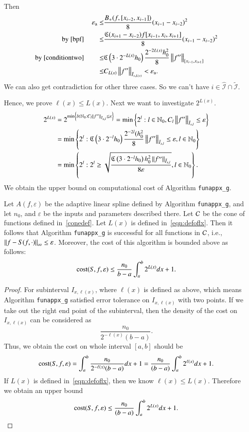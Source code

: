 \begin{enumerate}
  Then
  \begin{align*}
  \abstol \le & \frac{B_+(f,[x_{i-2},x_{i-1}])}{8}(x_{i-1}-x_{i-2})^2 \\ 
  \text{by } \eqref{bpf} \qquad \le  &\frac{\fC(x_{i+1}-x_{i-2})f[x_{i-1},x_{i},x_{i+1}]}{8}(x_{i-1}-x_{i-2})^2\\
  \text{by } \eqref{conditiontwo} \qquad  \le & \fC\left(3\cdot2^{-L(x)}h_0\right) \frac{2^{-2L(x)}h_0^2}{8}\norm[{[x_{i-1},x_{i+1}]}]{f''} \\
     \le & C_{L(x)} \norm[\bar{I}_{x,L(x)}]{f''} < \abstol.
  \end{align*}
  We can also get contradiction for other three cases. So we can't have $i \in \widehat{\mathcal{I}}\cap \widetilde{\mathcal{I}}$.
\end{enumerate}
Hence, we prove $\ell(x) \le L(x)$. Next we want to investigate $2^{L(x)}$.
\begin{align*}
2^{L(x)}&=2^{\min \left\{ l \in \natzero : C_l  \norm[\bar{I}_{x,l}]{f''} \le \varepsilon\right\}} = \min\left\{2^l: l \in  \natzero, C_l \norm[\bar{I}_{x,l}]{f''} \le \varepsilon\right\}\\
 & = \min\left\{2^l:  \fC\left(3\cdot 2^{-l} h_0\right) \frac{2^{-2l}(h_0^2}{8} \norm[\bar{I}_{x,l}]{f''}  \le \varepsilon,  l \in  \natzero\right\}\nonumber \\
 & = \min\left\{2^l:  2^l \ge \sqrt{\frac{\fC\left(3\cdot 2^{-l} h_0\right) h_0^2 \norm[\bar{I}_{x,l}]{f''} }{8\varepsilon}},  l \in  \natzero\right\}.
\end{align*}
We obtain the upper bound on computational cost of Algorithm \texttt{funappx\_g}.

\begin{theorem}\label{thm:cost}
Let $A(f,\varepsilon)$ be the adaptive linear spline defined by Algorithm \textnormal{\texttt{funappx\_g}}, and let $n_0$, and $\varepsilon$ be the inputs and parameters described there. Let $\cc$ be the cone of functions defined in~\eqref{conedef}.
Let $L(x)$ is defined in~\eqref{eqn:defoflx}.
Then it follows that Algorithm \textnormal{\texttt{funappx\_g}} is successful for all functions in $\cc$,  i.e.,  $\norm[\infty]{f - S(f, \cdot)} \le \varepsilon$.  Moreover, the cost of this algorithm is bounded above as follows:
$$\cost(S,f,\varepsilon) \le \frac{n_0}{b-a}\int_a^b 2^{L(x)} dx +1.$$
\end{theorem}

\begin{proof}
For subinterval $I_{x,\ell(x)}$, where $\ell(x)$ is defined as above,
which means Algorithm \texttt{funappx\_g} satisfied error tolerance on $I_{x,\ell(x)}$ with two points.
If we take out the right end point of the subinterval, then the density of the cost on $I_{x,\ell(x)}$ can be considered as
$$\frac{n_0}{2^{-\ell(x)}(b-a)}.$$
Thus, we obtain the cost on whole interval $[a,b]$ should be
$$\cost(S,f,\varepsilon)  = \int_a^b \frac{n_0}{2^{-\ell(x)}(b-a)}dx +1= \frac{n_0}{(b-a)}\int_a^b 2^{\ell(x)}dx +1.
$$
If $L(x)$ is defined in~\eqref{eqn:defoflx}, then we know $\ell(x) \le L(x)$. Therefore we obtain an upper bound
$$\cost(S,f,\varepsilon)  \le \frac{n_0}{(b-a)}\int_a^b 2^{L(x)}dx +1.
$$
\end{proof}


